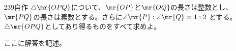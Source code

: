 \begin{prob}{239}{}{自作}
 $\triangle\mr{OPQ}$について、$\mr{OP}$と$\mr{OQ}$の長さは整数とし、$\mr{PQ}$の長さは素数とする。さらに$\angle\mr{P}:\angle\mr{Q}=1:2$ とする。$\triangle\mr{OPQ}$としてあり得るものをすべて求めよ。
\end{prob}

ここに解答を記述。
